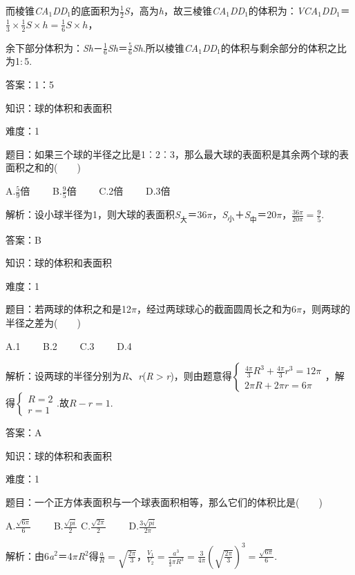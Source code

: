 \documentclass{article} %
\begin{document}
而棱锥\textit{C}­\textit{A}${}_{1}$\textit{DD}${}_{1}$的底面积为$\frac{1}{2}$\textit{S}，高为\textit{h}，故三棱锥\textit{C}­\textit{A}${}_{1}$\textit{DD}${}_{1}$的体积为：\textit{VC}­\textit{A}${}_{1}$\textit{DD}${}_{1}$＝$\frac{1}{3}\times\frac{1}{2}S\times h=\frac{1}{6}S\times h$，

余下部分体积为：\textit{Sh}－$\frac{1}{6}$\textit{Sh}＝$\frac{5}{6}$\textit{Sh}.所以棱锥\textit{C}­\textit{A}${}_{1}$\textit{DD}${}_{1}$的体积与剩余部分的体积之比为1$\mathrm{:}$5.

答案：1：5



知识：球的体积和表面积

难度：1

题目：如果三个球的半径之比是1︰2︰3，那么最大球的表面积是其余两个球的表面积之和的(　　)

A.$\frac{5}{9}$倍　　 B.$\frac{9}{5}$倍　　 C.2倍　　 D.3倍

解析：设小球半径为1，则大球的表面积\textit{S}${}_{\textrm{大}}$＝36$\pi$，\textit{S}${}_{\textrm{小}}$＋\textit{S}${}_{\textrm{中}}$＝20$\pi$，$\frac{36\pi}{20\pi}=\frac{9}{5}$.

答案：B

知识：球的体积和表面积

难度：1

题目：若两球的体积之和是12\textit{$\pi$}，经过两球球心的截面圆周长之和为6\textit{$\pi$}，则两球的半径之差为(　　)

A.1　　 B.2　　 C.3　　 D.4

解析：设两球的半径分别为\textit{R}、\textit{r}(\textit{R}$\mathrm{>}$\textit{r})，则由题意得$\left \{
\begin{array}{l} 
\frac{4\pi}{3}R^3+\frac{4\pi}{3}r^3=12\pi\\  
2\pi R+2\pi r=6\pi
\end{array} 
\right.$，解得$\left \{
\begin{array}{l} 
R=2\\ 
r=1
\end{array} 
\right.$.故$R-r=1$.

答案：A

知识：球的体积和表面积

难度：1

题目：一个正方体表面积与一个球表面积相等，那么它们的体积比是(　　)

A.$\frac{\sqrt{6\pi}}{6}$　　 B.$\frac{\sqrt{pi}}{2}$  C.$\frac{\sqrt{2\pi}}{2}$　　 D.$\frac{3\sqrt{pi}}{2\pi}$

解析：由6\textit{a}${}^{2}$＝4$\pi$\textit{R}${}^{2}$得$\frac{a}{R}=\sqrt{\frac{2\pi}{3}}$，$\frac{V_1}{V_2}=\frac{a^3}{\frac{4}{3}\pi R^3}=\frac{3}{4\pi}(\sqrt{\frac{2\pi}{3}})^3=\frac{\sqrt{6\pi}}{6}$.
\end{document}
